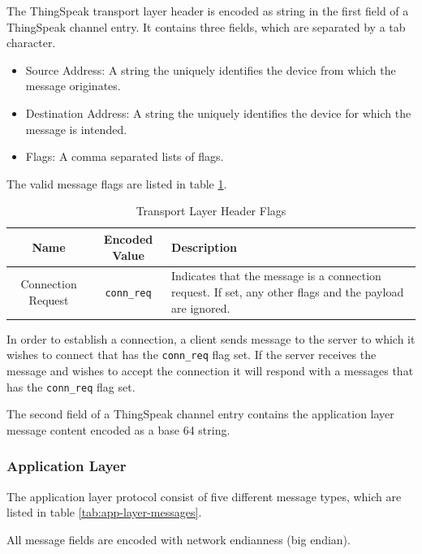 The ThingSpeak transport layer header is encoded as string in the first field of
a ThingSpeak channel entry. It contains three fields, which are separated by a
tab character.
\begin{itemize}
    \item Source Address: A string the uniquely identifies the device from which
          the message originates.
    \item Destination Address: A string the uniquely identifies the device for
          which the message is intended.
    \item Flags: A comma separated lists of flags.
\end{itemize}

The valid message flags are listed in table \ref{tab:ts-transport-flags}.

\begin{table}[htb]
\centering
\begin{tabular}{ c | c | m{6.0cm} }
\toprule
Name & Encoded Value & Description\\
\midrule
Connection Request & \verb|conn_req| & Indicates that the message is a connection
request. If set, any other flags and the payload are ignored.\\
\bottomrule
\end{tabular}
\caption{Transport Layer Header Flags}
\label{tab:ts-transport-flags}
\end{table}

In order to establish a connection, a client sends message to the server to
which it wishes to connect that has the \verb|conn_req| flag set. If the server
receives the message and wishes to accept the connection it will respond with a
messages that has the \verb|conn_req| flag set.

The second field of a ThingSpeak channel entry contains the application layer
message content encoded as a base 64 string.

\subsubsection{Application Layer}

The application layer protocol consist of five different message types, which
are listed in table \ref{tab:app-layer-messages}.

All message fields are encoded with network endianness (big endian).

